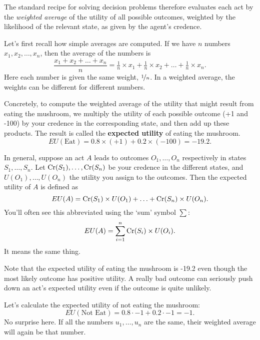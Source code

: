 The standard recipe for solving decision problems therefore evaluates
each act by the \emph{weighted average} of the utility of all possible
outcomes, weighted by the likelihood of the relevant state, as given
by the agent's credence.

Let's first recall how simple averages are computed. If we have $n$
numbers $x_1, x_2, \ldots, x_n$, then the average of the numbers is
\[
\frac{x_1 + x_2 + \ldots + x_n}{n} = \tfrac{1}{n}\times x_1 + \tfrac{1}{n}\times x_2 + \ldots + \tfrac{1}{n}\times x_n.
\]
Here each number is given the same weight, $\nicefrac{1}{n}$. In a
weighted average, the weights can be different for different numbers.

Concretely, to compute the weighted average of the utility that might
result  from eating the mushroom, we multiply the utility of each
possible outcome (+1 and -100) by your credence in the corresponding
state, and then add up these products. The result is called the
\textbf{expected utility} of eating the mushroom.
\[
EU(\text{Eat}) = 0.8 \times (+1) + 0.2 \times (-100) = -19.2.
\]

In general, suppose an act $A$ leads to outcomes $O_1,\ldots,O_n$
respectively in states $S_1,\ldots, S_n$. Let
$\text{Cr}(S_1),\ldots,\text{Cr}(S_n)$ be your credence in the different states,
and $U(O_1),\ldots,U(O_n)$ the utility you assign to the
outcomes. Then the expected utility of $A$ is defined as
\[
EU(A) = \text{Cr}(S_1) \times U(O_1) + \ldots + \text{Cr}(S_n) \times U(O_n).
\]
You'll often see this abbreviated using the `sum' symbol $\sum$:
\[
EU(A) = \sum_{i=1}^n \text{Cr}(S_i) \times U(O_i).
\]
It means the same thing.



Note that the expected utility of eating the mushroom is -19.2 even
though the most likely outcome has positive utility. A really bad
outcome can seriously push down an act's expected utility even if the
outcome is quite unlikely. 

Let's calculate the expected utility of not eating the mushroom:
\[
EU(\text{Not Eat}) = 0.8 \cdot -1 + 0.2 \cdot -1 = -1.
\]
No surprise here. If all the numbers $u_1,\ldots,u_n$ are the same,
their weighted average will again be that number.

